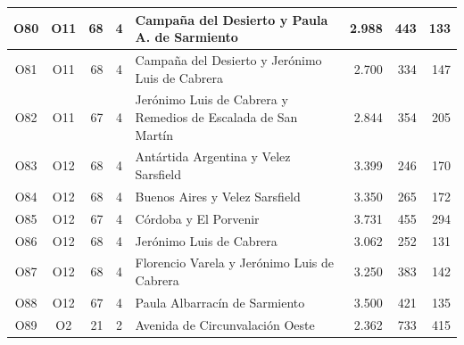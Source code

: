 \begin{longtable}{|c|c|r|c|p{4.2cm}|r|r|r|}
O80 & O11 & 68 & 4 & Campaña del Desierto y Paula A. de Sarmiento & 2.988 & 443 & 133 \\ \hline
O81 & O11 & 68 & 4 & Campaña del Desierto y Jerónimo Luis de Cabrera & 2.700 & 334 & 147 \\ \hline
O82 & O11 & 67 & 4 & Jerónimo Luis de Cabrera y Remedios de Escalada de San Martín & 2.844 & 354 & 205 \\ \hline
O83 & O12 & 68 & 4 & Antártida Argentina y Velez Sarsfield & 3.399 & 246 & 170 \\ \hline
O84 & O12 & 68 & 4 & Buenos Aires y Velez Sarsfield & 3.350 & 265 & 172 \\ \hline
O85 & O12 & 67 & 4 & Córdoba y El Porvenir & 3.731 & 455 & 294 \\ \hline
O86 & O12 & 68 & 4 & Jerónimo Luis de Cabrera & 3.062 & 252 & 131 \\ \hline
O87 & O12 & 68 & 4 & Florencio Varela y Jerónimo Luis de Cabrera & 3.250 & 383 & 142 \\ \hline
O88 & O12 & 67 & 4 & Paula Albarracín de Sarmiento & 3.500 & 421 & 135 \\ \hline
O89 & O2 & 21 & 2 & Avenida de Circunvalación Oeste & 2.362 & 733 & 415 \\ \hline
\end{longtable}
